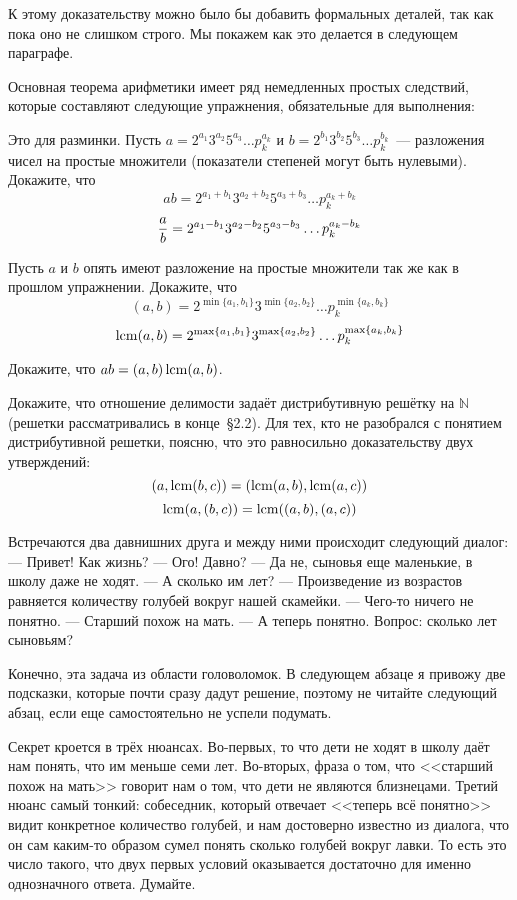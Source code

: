 К этому доказательству можно было бы добавить формальных деталей, так как пока оно не слишком строго. Мы покажем как это делается в следующем параграфе.

Основная теорема арифметики имеет ряд немедленных простых следствий, которые составляют следующие упражнения, обязательные для выполнения:

\begin{exercise}
Это для разминки. Пусть $a = 2^{a_1}3^{a_2}5^{a_3}\ldots p_k^{a_k}$ и $b = 2^{b_1}3^{b_2}5^{b_3}\ldots p_k^{b_k}$~--- разложения чисел на простые множители (показатели степеней могут быть нулевыми). Докажите, что
$$ab = 2^{a_1+b_1}3^{a_2+b_2}5^{a_3+b_3}\ldots p_k^{a_k+b_k}$$
$${a\over b} = 2^{a_1-b_1}3^{a_2-b_2}5^{a_3-b_3}\ldots p_k^{a_k-b_k}$$
\end{exercise}

\begin{exercise}
Пусть $a$ и $b$ опять имеют разложение на простые множители так же как в прошлом упражнении. Докажите, что
$$(a, b) = 2^{\min\{a_1, b_1\}} 3^{\min\{a_2, b_2\}}\ldots p_k^{\min\{a_k, b_k\}}$$
$$\operatorname{lcm}(a, b) = 2^{\max\{a_1, b_1\}} 3^{\max\{a_2, b_2\}}\ldots p_k^{\max\{a_k, b_k\}}$$
\end{exercise}

\begin{exercise}
Докажите, что $ab = (a, b) \operatorname{lcm}(a, b)$.
\end{exercise}

\begin{exercise}
Докажите, что отношение делимости задаёт дистрибутивную решётку на $\mathbb{N}$ (решетки рассматривались в конце~\S2.2). Для тех, кто не разобрался с понятием дистрибутивной решетки, поясню, что это равносильно доказательству двух утверждений:
$$(a, \operatorname{lcm}(b, c)) = (\operatorname{lcm}(a, b), \operatorname{lcm}(a, c))$$
$$\operatorname{lcm}(a, (b, c)) = \operatorname{lcm}((a, b), (a, c))$$
\end{exercise}

\begin{exercise}
Встречаются два давнишних друга и между ними происходит следующий диалог:
--- Привет! Как жизнь?
--- Ого! Давно?
--- Да не, сыновья еще маленькие, в школу даже не ходят.
--- А сколько им лет?
--- Произведение из возрастов равняется количеству голубей вокруг нашей скамейки.
--- Чего-то ничего не понятно.
--- Старший похож на мать.
--- А теперь понятно.
Вопрос: сколько лет сыновьям?
\end{exercise}

Конечно, эта задача из области головоломок. В следующем абзаце я привожу две подсказки, которые почти сразу дадут решение, поэтому не читайте следующий абзац, если еще самостоятельно не успели подумать.

Секрет кроется в трёх нюансах. Во-первых, то что дети не ходят в школу даёт нам понять, что им меньше семи лет. Во-вторых, фраза о том, что <<старший похож на мать>> говорит нам о том, что дети не являются близнецами. Третий нюанс самый тонкий: собеседник, который отвечает <<теперь всё понятно>> видит конкретное количество голубей, и нам достоверно известно из диалога, что он сам каким-то образом сумел понять сколько голубей вокруг лавки. То есть это число такого, что двух первых условий оказывается достаточно для именно однозначного ответа. Думайте.